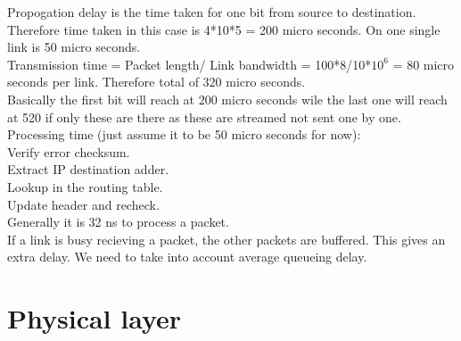 \documentclass[solution,addpoints,12pt]{exam}
\begin{document}
Propogation delay is the time taken for one bit from source to destination.
Therefore time taken in this case is 4*10*5 = 200 micro seconds. On
one single link is 50 micro seconds.\\

Transmission time = Packet length/ Link bandwidth = 100*8/10*$10^6$ = 80 micro
seconds
per link. Therefore total of 320 micro seconds.\\
Basically the first bit will reach at 200 micro seconds wile the last one will
reach at
520 if only these are there as these are streamed not sent one by one.\\

Processing time (just assume it to be 50 micro seconds for now):\\
Verify error checksum.\\
Extract IP destination adder.\\
Lookup in the routing table.\\
Update header and recheck.\\

Generally it is 32 ns to process a packet.\\
If a link is busy recieving a packet, the other packets are buffered.
This gives an extra delay. We need to take into account
average queueing delay.
\section{Physical layer}
\end{document}
